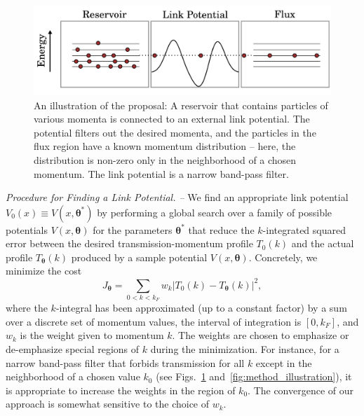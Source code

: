 \documentclass[twocolumn,amsmath,amssymb,showpacs,pra,superscriptaddress,aps]{revtex4-1}
\begin{document}
\begin{figure}
\centerline{\includegraphics[scale=0.4]{figure1new.pdf}}
\caption{An illustration of the proposal: A reservoir that contains particles of various momenta is connected to an external link potential. The potential filters out the desired momenta, and the particles in the flux region have a known momentum distribution -- here, the distribution is non-zero only in the neighborhood of a chosen momentum. The link potential is a narrow band-pass filter.
}
\label{fig:Figure1}
\end{figure}

{\it Procedure for Finding a Link Potential. --} 
We find an appropriate link potential $V_0(x) \equiv V(x,\bm{\theta}^*)$ by performing a global search over a family of possible potentials $V(x,\bm{\theta})$ for the parameters $\bm{\theta}^*$ that reduce the $k$-integrated squared error between the desired transmission-momentum profile $T_0(k)$ and the actual profile $T_{\bm\theta}(k)$ produced by a sample potential $V(x, \bm{\theta})$. Concretely, we minimize the cost
\begin{equation}\label{eq:cost1}
  J_{\bm{\theta}} = \sum_{0<k<k_F} w_k\left|T_0(k) - T_{\bm{\theta}}(k)\right|^2,
\end{equation}
where the $k$-integral has been approximated (up to a constant factor) by a sum over a discrete set of momentum values, the interval of integration is $[0,k_F]$, and $w_k$ is the weight given to momentum $k$. The weights are chosen to emphasize or de-emphasize special regions of $k$ during the minimization. For instance, for a narrow band-pass filter that forbids transmission for all $k$ except in the neighborhood of a chosen value $k_0$ (see Figs.~\ref{fig:Figure1} and~\ref{fig:method_illustration}), it is appropriate to increase the weights in the region of $k_0$. The convergence of our approach is somewhat sensitive to the choice of $w_k$.
\end{document}
